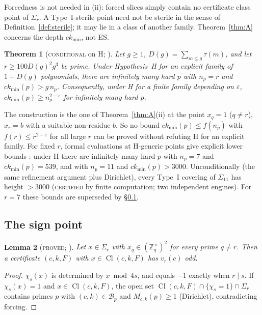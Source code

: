 \documentclass[11pt,reqno]{amsart}
\newtheorem{theorem}{Theorem}[section]
\newtheorem{lemma}[theorem]{Lemma}
\theoremstyle{definition}
\newcommand{\Z}{\mathbb Z}
\newcommand{\Cl}{\operatorname{Cl}}
\newcommand{\ckmin}{ck_{\min}}
\newcommand{\status}[1]{\textup{\textsc{#1}}}
\begin{document}
Forcedness is not needed in (ii): forced slices simply contain no
certificate class point of $\Sigma_r$.  A Type~I-sterile point need not be
sterile in the sense of Definition~\ref{def:sterile}; it may lie in a
class of another family.  Theorem~\ref{thm:A} concerns the depth
$\ckmin$, not ES.

\begin{theorem}[\status{conditional} on H; {\cite[Thm.~2.1]{PT1}}]\label{thm:unbounded}
Let $g\ge1$, $D(g)=\sum_{m\le g}\tau(m)$, and let $r\ge100D(g)^2g^3$ be
prime.  Under Hypothesis~H for an explicit family of $1+D(g)$
polynomials, there are infinitely many hard $p$ with $n_p=r$ and
$\ckmin(p)>g\,n_p$.  Consequently, under H for a finite family depending
on $\varepsilon$, $\ckmin(p)\ge n_p^{2-\varepsilon}$ for infinitely many
hard $p$.
\end{theorem}

The construction is the one of Theorem~\ref{thm:A}(ii) at the point
$x_q=1$ ($q\ne r$), $x_r=b$ with a suitable non-residue $b$.  So no bound
$\ckmin(p)\le f(n_p)$ with $f(r)\le r^{2-\varepsilon}$ for all large $r$
can be proved without refuting H for an explicit family.  For fixed $r$,
formal evaluations at H-generic points give explicit lower bounds
\cite[\S6.2]{PT1}: under H there are infinitely many hard $p$ with
$n_p=7$ and $\ckmin(p)=539$, and with $n_p=11$ and $\ckmin(p)>3000$.
Unconditionally (the same refinement argument plus Dirichlet), every
Type~I covering of $\Sigma_{11}$ has height $>3000$
(\status{certified} by finite computation; two independent engines).  For
$r=7$ these bounds are superseded by \S\ref{subsec:sign}.

\subsection{The sign point}\label{subsec:sign}

\begin{lemma}[\status{proved}; {\cite[Lemma~2.1 and \S4]{PT2}}]\label{lem:squareoff}
Let $x\in\Sigma_r$ with $x_q\in(\Z_q^\times)^2$ for every prime $q\ne r$.
Then a certificate $(c,k,F)$ with $x\in\Cl(c,k,F)$ has $v_r(c)$ odd.
\end{lemma}

\begin{proof}
$\chi_s(x)$ is determined by $x\bmod 4s$, and equals $-1$ exactly when
$r\mid s$.  If $\chi_s(x)=1$ and $x\in\Cl(c,k,F)$, the open set
$\Cl(c,k,F)\cap\{\chi_s=1\}\cap\Sigma_r$ contains primes $p$ with
$(c,k)\in\mathcal B_p$ and $M_{c,k}(p)\ge1$ (Dirichlet), contradicting
forcing.
\end{proof}
\end{document}

